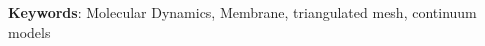 \begin{latin}

%
%
% 





\bigskip\noindent\textbf{Keywords}:
Molecular Dynamics, Membrane, triangulated mesh, continuum models

\end{latin}
